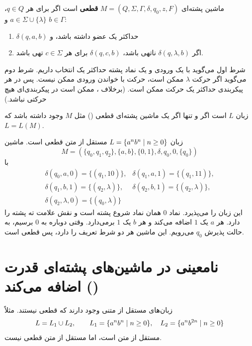 \begin{definition}
ماشین پشته‌ای $M=(Q,\Sigma,\Gamma,\delta,q_0,z,F)$ \textbf{قطعی} است اگر برای هر $q\in Q$، $a\in\Sigma\cup\{\lambda\}$ و $b\in\Gamma$:
\begin{enumerate}
\item $\delta(q,a,b)$ حداکثر یک عضو داشته باشد، و
\item اگر $\delta(q,\lambda,b)$ ناتهی باشد، $\delta(q,c,b)$ برای هر $c\in\Sigma$ تهی باشد.
\end{enumerate}
\end{definition}

شرط اول می‌گوید با یک ورودی و یک نماد پشته حداکثر یک انتخاب داریم. شرط دوم می‌گوید اگر حرکت $\lambda$ ممکن است، حرکت با خواندن ورودی ممکن نیست. پس در هر پیکربندی حداکثر یک حرکت ممکن است. (برخلاف ، ممکن است در پیکربندی‌ای هیچ حرکتی نباشد.)

\begin{definition}
زبان $L$  است اگر و تنها اگر یک ماشین پشته‌ای قطعی () مثل $M$ وجود داشته باشد که $L=L(M)$.
\end{definition}

\begin{example}
زبان $L=\{a^nb^n\mid n\ge0\}$ مستقل از متن قطعی است. ماشین
\[M=(\{q_0,q_1,q_2\},\{a,b\},\{0,1\},\delta,q_0,0,\{q_0\})\]
با
\[\begin{array}{ll}
\delta(q_0,a,0)=\{(q_1,10)\}, & \delta(q_1,a,1)=\{(q_1,11)\},\\
\delta(q_1,b,1)=\{(q_2,\lambda)\}, & \delta(q_2,b,1)=\{(q_2,\lambda)\},\\
\delta(q_2,\lambda,0)=\{(q_0,\lambda)\} &
\end{array}\]
این زبان را می‌پذیرد. نماد $0$ همان نماد شروع پشته است و نقش علامت ته پشته را دارد. هر $a$ یک $1$ اضافه می‌کند و هر $b$ یک $1$ برمی‌دارد. وقتی دوباره به $0$ برسیم، به حالت پذیرش $q_0$ می‌رویم. این ماشین هر دو شرط تعریف را دارد، پس قطعی است.
\end{example}

\section{نامعینی در ماشین‌های پشته‌ای قدرت اضافه می‌کند ()}

\begin{theorem}
زبان‌های مستقل از متنی وجود دارند که قطعی نیستند. مثلاً
\[L=L_1\cup L_2,\qquad L_1=\{a^nb^n\mid n\ge0\},\quad L_2=\{a^nb^{2n}\mid n\ge0\}\]
مستقل از متن است، اما مستقل از متن قطعی نیست.
\end{theorem}

